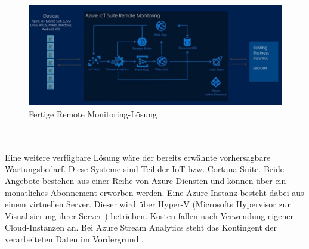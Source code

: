 \begin{figure}[ht!]
	\centering
	\includegraphics[width=1.0\linewidth]{images/remote_monitor}
	\caption{Fertige Remote Monitoring-Lösung \cite{Azure.2017}} %
	\label{fig:remote_monitor}
\end{figure}
\\ \\Eine weitere verfügbare Lösung wäre der bereits erwähnte vorhersagbare Wartungsbedarf. Diese Systeme sind Teil der IoT bzw. Cortana Suite. Beide Angebote bestehen aus einer Reihe von Azure-Diensten und können über ein monatliches Abonnement erworben werden.   
Eine Azure-Instanz besteht dabei aus einem virtuellen Server. Dieser wird über Hyper-V (Microsofts Hypervisor zur Visualisierung ihrer Server \cite{searchdatacenter.2017}) betrieben. Kosten fallen nach Verwendung eigener Cloud-Instanzen an. Bei Azure Stream Analytics steht das Kontingent der verarbeiteten Daten im Vordergrund \cite{PeterTsai.2016}.  
